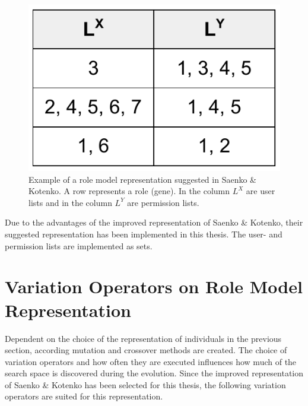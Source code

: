         \begin{figure}[H]
            \centering
            \includegraphics[scale=0.4]{./Figures/ComplexRepresentation2}
            \caption{Example of a role model representation suggested in Saenko \& Kotenko\cite{saenko2012design}. A row represents a role (gene). In the column $L^X$ are user lists and in the column $L^Y$ are permission lists.}
            \label{fig:representation3}
        \end{figure}
        Due to the advantages of the improved representation of Saenko \& Kotenko\cite{saenko2012design}, their suggested representation has been implemented in this thesis. The user- and permission lists are implemented as sets.
    
    \section{Variation Operators on Role Model Representation}
    Dependent on the choice of the representation of individuals in the previous section, according mutation and crossover methods are created. The choice of variation operators and how often they are executed influences how much of the search space is discovered during the evolution. Since the improved representation of Saenko \& Kotenko\cite{saenko2012design} has been selected for this thesis, the following variation operators are suited for this representation.
